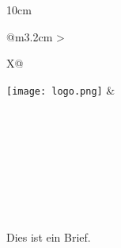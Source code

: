 \documentclass[a4paper,11pt]{article}
\newcommand{\contactinfo}{%
    \FjCompanyUrl \\
    \FjCompanyEmail \\
}
\begin{document}
\thispagestyle{firstpage}

\renewcommand{\footrulewidth}{0.4pt}

\begin{minipage}[t]{0.33\textwidth}
\raggedright
\vspace{-2.9em}
  \textsc{\FjClientCompany}\\[0.3ex]
  \textbf{\FjClientCareOf}\\[0.3ex]
  \FjClientStreet \\[0.3ex]
  \FjClientAreaCode\space \FjClientCity\\[0.3ex]
  \FjClientCountry \\[0.3ex]
\end{minipage}
\hfill
\begin{minipage}[t]{0.65\textwidth}
\begin{center}
\begin{tabularx}{10cm}{@{}m{3.2cm} >{\raggedright\arraybackslash}X@{}}
\texttt{[image: logo.png]} &
\begin{minipage}[t]{\linewidth}
  \vspace{-3.5em}
  \small
  \textbf{\FjCompanyName} \\[-0.2em]
  \FjCompanyStreet\\[-0.2ex]
  \FjCompanyAreaCodeCity\\[1.2ex]
  \contactinfo
\end{minipage}
\end{tabularx}
\end{center}
\end{minipage}

\setlength{\parindent}{0pt}
\setlength{\parskip}{0.5em}

\vspace{1.5cm}
\null\hfill \FjLetterCityDate \space \FjDate

\vspace{1.5cm}
\textbf{\FjSubject}
\vspace{1cm}

\greeting\\[2ex]
\\
Dies ist ein Brief.



\vspace{2em}
\FjGoodbye \\[2ex]
\FjMyName
\end{document}
